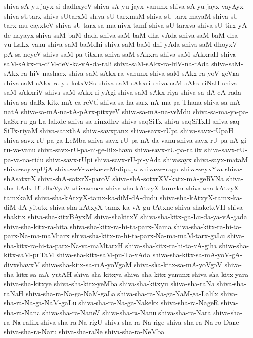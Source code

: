 {shiva-sA-yu-jayx-si-dadhxyeV
shiva-sA-yu-jayx-vanunx
shiva-sA-yu-jayx-vayAyx
shiva-sUtarx
shiva-sUtarxM
shiva-sU-tarxmaM
shiva-sU-tarx-mayaM
shiva-sU-tarx-mu-cayxteV
shiva-sU-tarx-sa-ma-nivx-tamf
shiva-sU-tarxva
shiva-sU-tirx-yA-de-nayayx
shiva-saM-baM-dada
shiva-saM-baM-dha-vAda
shiva-saM-baM-dha-vu-LaLx-vanu
shiva-saM-baMdhi
shiva-saM-baM-dhi-yAda
shiva-saM-dhoyxV-pA-sa-neyeV
shiva-saM-pa-titxna
shiva-saM-sAkxra
shiva-saM-sAkxraH
shiva-saM-sAkx-ra-diM-deV-ka-vA-da-rali
shiva-saM-sAkx-ra-hiV-na-rAda
shiva-saM-sAkx-ra-hiV-nashacx
shiva-saM-sAkx-ra-vanunx
shiva-saM-sAkx-ra-yoV-geVna
shiva-saM-sAkx-ra-yu-ketxVSu
shiva-saM-sAkxri
shiva-saM-sAkx-riNaH
shiva-saM-sAkxriV
shiva-saM-sAkx-ri-yAgi
shiva-saM-sAkx-riya
shiva-sa-dA-cA-rada
shiva-sa-daBx-kitx-mA-ca-reVtf
shiva-sa-ha-sarx-nA-ma-pa-Thana
shiva-sa-mA-natA
shiva-sa-mA-na-tA-pArx-pitxyeV
shiva-sa-mA-na-veMdu
shiva-sa-ma-ya-pa-kaSx-ru-ga-La-lalxde
shiva-sa-ninxdhw
shiva-saqSiTx
shiva-saqSiTxH
shiva-saq-SiTx-riyaM
shiva-satxthA
shiva-savxpanx
shiva-savx-rUpa
shiva-savx-rUpaH
shiva-savx-rU-pa-ga-LeMba
shiva-savx-rU-pa-nA-da-vanu
shiva-savx-rU-pa-nA-gi-ru-va-vanu
shiva-savx-rU-pa-ni-ge-lilx-havo
shiva-savx-rU-pa-ralilx
shiva-savx-rU-pa-va-na-ridu
shiva-savx-rUpi
shiva-savx-rU-pi-yAda
shivasayx
shiva-sayx-mataM
shiva-sayx-pUjA
shiva-seV-va-ka-veM-dipapx
shiva-se-ragu
shiva-seyxYva
shiva-shAsatxrX
shiva-shA-satxrX-paroV
shiva-shA-sotxrXV-katx-mA-geRVNa
shiva-sha-bAdx-Bi-dheVyoV
shivashacx
shiva-sha-kAtxyX-tamxka
shiva-sha-kAtxyX-tamxkaM
shiva-sha-kAtxyX-tamx-ka-diM-dA-dudu
shiva-sha-kAtxyX-tamx-ka-diM-dA-yitutx
shiva-sha-kAtxyX-tamx-ka-vA-gu-tAtxne
shiva-shaketxVH
shiva-shakitx
shiva-sha-kitxBAyxM
shiva-shakitxV
shiva-sha-kitx-ga-Lu-da-ya-vA-gada
shiva-sha-kitx-ra-hita
shiva-sha-kitx-ra-hi-ta-parx-Nama
shiva-sha-kitx-ra-hi-ta-parx-Na-ma-maMtarx
shiva-sha-kitx-ra-hi-ta-parx-Na-ma-maM-tarx-gaLu
shiva-sha-kitx-ra-hi-ta-parx-Na-va-maMtarxH
shiva-sha-kitx-ra-hi-ta-vA-giha
shiva-sha-kitx-saM-puTaM
shiva-sha-kitx-saM-pu-Ta-vAda
shiva-sha-kitx-sa-mA-yoV-gA-divxshavxM
shiva-sha-kitx-sa-mA-yoVgaM
shiva-sha-kitx-sa-mA-yoVgoV
shiva-sha-kitx-sa-mA-yutAH
shiva-sha-kitxya
shiva-sha-kitx-yanunx
shiva-sha-kitx-yara
shiva-sha-kitxye
shiva-sha-kitx-yeMba
shiva-sha-kitxyu
shiva-sha-raNa
shiva-sha-raNaH
shiva-sha-ra-Na-ga-NaM-gaLa
shiva-sha-ra-Na-ga-NaM-ga-Lalilx
shiva-sha-ra-Na-ga-NaM-gaLu
shiva-sha-ra-Na-ga-Nakekx
shiva-sha-ra-NageR
shiva-sha-ra-Nana
shiva-sha-ra-NaneV
shiva-sha-ra-Nanu
shiva-sha-ra-Nara
shiva-sha-ra-Na-ralilx
shiva-sha-ra-Na-rigU
shiva-sha-ra-Na-rige
shiva-sha-ra-Na-ro-Dane
shiva-sha-ra-Naru
shiva-sha-raNe
shiva-sha-ra-NeMba
}
